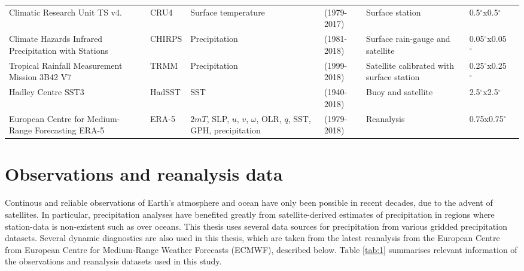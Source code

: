 \begin{sidewaystable}
\begin{tabular}{p{5cm}|p{1.47cm}p{3.45cm}p{2.12cm}p{4.2cm}p{2.12cm}p{3.54cm}}
Climatic Research Unit TS  v4.     & CRU4         & Surface temperature  & (1979-2017)       &  Surface station    &  0.5$^\circ$x0.5$^\circ$   &        \citep{harris2014}                            \\
  Climate Hazards Infrared Precipitation with Stations   & CHIRPS          & Precipitation       & (1981-2018)       &  Surface rain-gauge and satellite               &  0.05$^\circ$x0.05$^\circ$ & \citep{funk2015}              \\
Tropical Rainfall Measurement Mission 3B42 V7       & TRMM          & Precipitation       & (1999-2018)   & Satellite calibrated with surface station   & 0.25$^\circ$x0.25$^\circ$  &  \citep{mission2011} \\
Hadley Centre SST3                           & HadSST          & SST               & (1940-2018)   & Buoy and satellite              & 2.5$^\circ$x2.5$^\circ$  &  \citep{kennedy2011} \\
European Centre for Medium-Range Forecasting ERA-5                            & ERA-5             & $2mT$, SLP, $u$, $v$, $\omega$, OLR, $q$, SST, GPH, precipitation    &  (1979-2018)    &  Reanalysis       & 0.75x0.75$^\circ$ &  \citep{era5,era5hersbach}
\end{tabular}

\end{sidewaystable}

\section{Observations and reanalysis data} \label{sq:obsdata}
Continous and reliable observations of Earth's  atmosphere and ocean have only been possible in recent decades, due to the advent of satellites. In particular, precipitation analyses have benefited greatly from satellite-derived estimates of precipitation in regions where station-data is non-existent such as over oceans.  %
This thesis uses several data sources for precipitation from various gridded precipitation datasets. 
Several dynamic diagnostics are also used in this thesis, which are taken from the latest reanalysis from the European Centre from European Centre for Medium-Range Weather Forecasts (ECMWF), described below. 
Table \ref{tab:1} summarises relevant information of the observations and reanalysis datasets used in this study.
 

